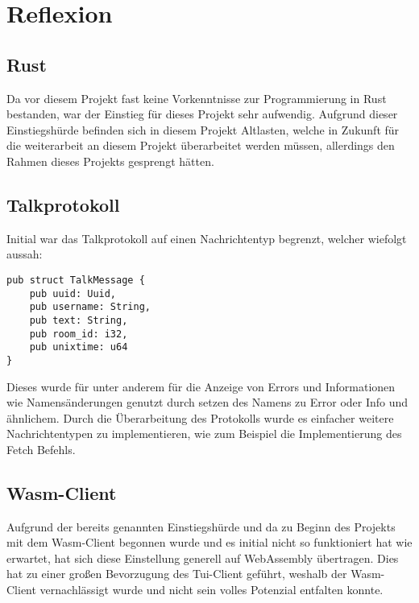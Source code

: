 \chapter{Reflexion}
\section{Rust}
Da vor diesem Projekt fast keine Vorkenntnisse zur Programmierung in Rust bestanden, war der Einstieg für dieses Projekt sehr aufwendig. Aufgrund dieser Einstiegshürde befinden sich in diesem Projekt Altlasten, welche in Zukunft für die weiterarbeit an diesem Projekt überarbeitet werden müssen, allerdings den Rahmen dieses Projekts gesprengt hätten.

\section{Talkprotokoll}
Initial war das Talkprotokoll auf einen Nachrichtentyp begrenzt, welcher wiefolgt aussah:

\begin{lstlisting}[caption=Altes Kommunikationsprotokoll, label=Altes_Kommunikationsprotokoll, basicstyle=\ttfamily\scriptsize]
pub struct TalkMessage {
    pub uuid: Uuid,
    pub username: String,
    pub text: String,
    pub room_id: i32,
    pub unixtime: u64
}
\end{lstlisting}
Dieses wurde für unter anderem für die Anzeige von Errors und Informationen wie Namensänderungen genutzt durch setzen des Namens zu Error oder Info und ähnlichem. Durch die Überarbeitung des Protokolls wurde es einfacher weitere Nachrichtentypen zu implementieren, wie zum Beispiel die Implementierung des Fetch Befehls.

\section{Wasm-Client}
Aufgrund der bereits genannten Einstiegshürde und da zu Beginn des Projekts mit dem Wasm-Client begonnen wurde und es initial nicht so funktioniert hat wie erwartet, hat sich diese Einstellung generell auf WebAssembly übertragen. Dies hat zu einer großen Bevorzugung des Tui-Client geführt, weshalb der Wasm-Client vernachlässigt wurde und nicht sein volles Potenzial entfalten konnte.

